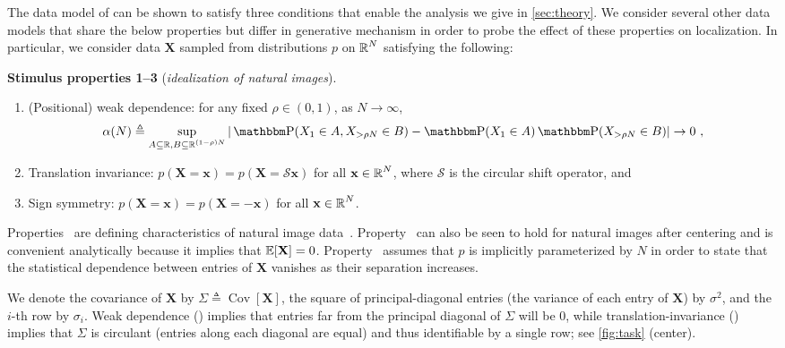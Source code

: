 The data model of \textcite{ingrosso2022data} 
can be shown to satisfy three conditions that enable the analysis we give in \cref{sec:theory}.
We consider several other data models that share the below properties but differ in generative mechanism
in order to probe the effect of these properties on localization.
In particular, we consider data $\mathbf{X}$ sampled from distributions $p$ on $\operatorname{\mathbb{R}}^N$ satisfying the following:
\begin{stimulus}{\textbf{Stimulus properties 1--3} (\emph{idealization of natural images}).}{}
\begin{enumerate}[series=propenumi]
  \item \label{item:weak-dependence} (Positional) weak dependence: for any fixed $\rho \in (0,1)$, as $N \to \infty$,
    $$\alpha(N) \triangleq \sup_{A \subseteq \R, B \subseteq \R^{(1-\rho) N}} |\PR(X_1 \in A, X_{> \rho N} \in B) - \PR(X_1 \in A) \PR(X_{> \rho N} \in B)| \to 0~,$$
  \item \label{item:translation-invariance} Translation invariance: $p(\mathbf{X} = \mathbf{x}) = p(\mathbf{X} = \mathcal{S} \mathbf{x})$ for all $\mathbf{x} \in \operatorname{\mathbb{R}}^N$, where $\mathcal{S}$ is the circular shift operator, and
  \item \label{item:sign-symmetry} Sign symmetry: $p(\mathbf{X} = \mathbf{x}) = p(\mathbf{X} = -\mathbf{x})$ for all $\mathbf{x} \in \operatorname{\mathbb{R}}^N$.
\end{enumerate}
\end{stimulus}
Properties~
are defining characteristics of natural image data~\parencite{hyvarinen2009natural}.
Property~
can also be seen to hold for natural images after centering
and is convenient analytically
because it implies that $\operatorname{\mathbb{E}}[\mathbf{X}] = 0$.
Property~ assumes that $p$ is implicitly parameterized by $N$
in order to state that the statistical dependence between entries of $\mathbf{X}$ vanishes 
as their separation increases.\smash{\footnotemark}

We denote the covariance of $\mathbf{X}$ by $\Sigma \triangleq \operatorname{Cov}[\mathbf{X}]$,
the square of principal-diagonal entries (the variance of each entry of $\mathbf{X}$) by $\sigma^2$, 
and the $i$-th row by $\sigma_i$.
Weak dependence () implies that entries far from the principal diagonal of $\Sigma$ will be 0, while translation-invariance () implies that $\Sigma$ is circulant (\ie entries along each diagonal are equal) and thus identifiable by a single row; see \cref{fig:task} (center).


